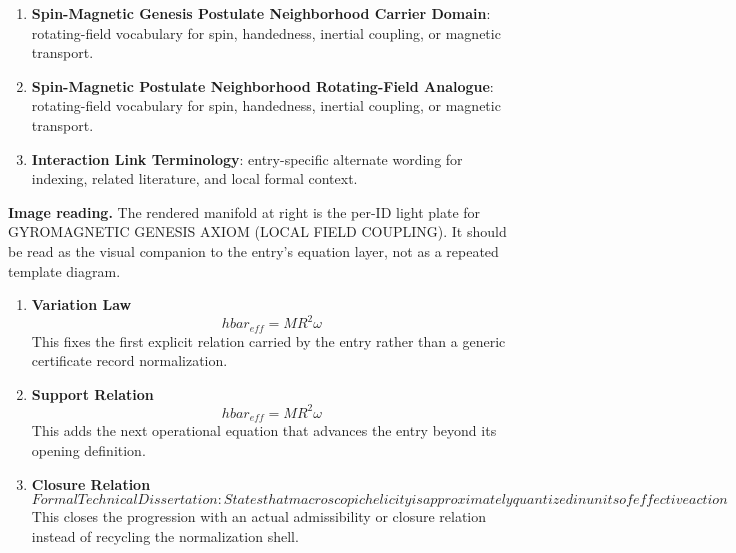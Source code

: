 \begin{enumerate}[leftmargin=1.6em,itemsep=6pt,topsep=4pt]
\item \textbf{Spin-Magnetic Genesis Postulate Neighborhood Carrier Domain}: rotating-field vocabulary for spin, handedness, inertial coupling, or magnetic transport.
\item \textbf{Spin-Magnetic Postulate Neighborhood Rotating-Field Analogue}: rotating-field vocabulary for spin, handedness, inertial coupling, or magnetic transport.
\item \textbf{Interaction Link Terminology}: entry-specific alternate wording for indexing, related literature, and local formal context.
\end{enumerate}

\begin{samepage}
\noindent\begin{minipage}[t]{0.45\linewidth}
\vspace{0pt}
\raggedright
\scriptsize\textbf{Image reading.} The rendered manifold at right is the per-ID light plate for GYROMAGNETIC GENESIS AXIOM (LOCAL FIELD COUPLING). It should be read as the visual companion to the entry's equation layer, not as a repeated template diagram.\par
\end{minipage}\hfill
\begin{minipage}[t]{0.53\linewidth}
\vspace*{-0.10in}
\raggedright
{}
\end{minipage}
\end{samepage}

\clearpage


\begin{enumerate}[leftmargin=1.6em,itemsep=9pt,topsep=6pt]
\item \textbf{Variation Law}
\[
hbar_{eff} = M R^2 \omega
\]
This fixes the first explicit relation carried by the entry rather than a generic certificate record normalization.

\item \textbf{Support Relation}
\[
hbar_{eff} = M R^2 \omega
\]
This adds the next operational equation that advances the entry beyond its opening definition.

\item \textbf{Closure Relation}
\[
Formal Technical Dissertation: States that macroscopic helicity is approximately quantized in units of effective action
\]
This closes the progression with an actual admissibility or closure relation instead of recycling the normalization shell.
\end{enumerate}

